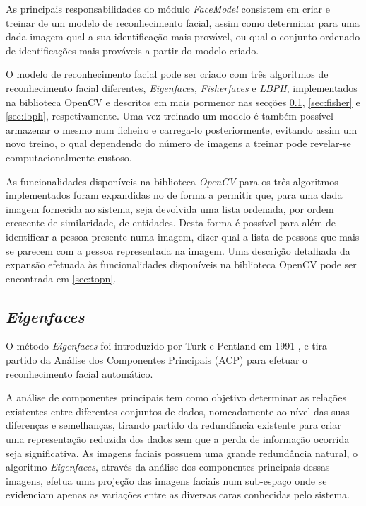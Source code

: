 As principais responsabilidades do módulo \textit{FaceModel} consistem em criar e treinar de um modelo de reconhecimento facial, assim como determinar para uma dada imagem qual a sua identificação mais provável, ou qual o conjunto ordenado de identificações mais prováveis a partir do modelo criado.

O modelo de reconhecimento facial pode ser criado com três algoritmos de reconhecimento facial diferentes, \textit{Eigenfaces}, \textit{Fisherfaces} e \textit{LBPH}, implementados na biblioteca OpenCV e descritos em mais pormenor nas secções \ref{sec:eigen}, \ref{sec:fisher} e \ref{sec:lbph}, respetivamente. Uma vez treinado um modelo é também possível armazenar o mesmo num ficheiro e carrega-lo posteriormente, evitando assim um novo treino, o qual dependendo do número de imagens a treinar pode revelar-se computacionalmente custoso.

As funcionalidades disponíveis na biblioteca \textit{OpenCV} para os três algoritmos implementados foram expandidas no de forma a permitir que, para uma dada imagem fornecida ao sistema, seja devolvida uma lista ordenada, por ordem crescente de similaridade, de entidades. Desta forma é possível para além de identificar a pessoa presente numa imagem, dizer qual a lista de pessoas que mais se parecem com a pessoa representada na imagem. Uma descrição detalhada da expansão efetuada às funcionalidades disponíveis na biblioteca OpenCV pode ser encontrada em \ref{sec:topn}.

\subsection{\textit{Eigenfaces}} \label{sec:eigen}
O método \textit{Eigenfaces} foi introduzido por Turk e Pentland em 1991 \cite{Turk1991}, e tira partido da Análise dos Componentes Principais (ACP) para efetuar o reconhecimento facial automático.

A análise de componentes principais tem como objetivo determinar as relações existentes entre diferentes conjuntos de dados, nomeadamente ao nível das suas diferenças e semelhanças, tirando partido da redundância existente para criar uma representação reduzida dos dados sem que a perda de informação ocorrida seja significativa. As imagens faciais possuem uma grande redundância natural, o algoritmo \textit{Eigenfaces}, através da análise dos componentes principais dessas imagens, efetua uma projeção das imagens faciais num sub-espaço onde se evidenciam apenas as variações entre as diversas caras conhecidas pelo sistema.

